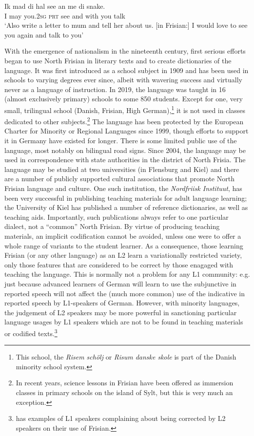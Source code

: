 \documentclass[output=paper]{langsci/langscibook}
\begin{document}
\gll Ik mad di hal see an me di snake. \\
     I may you.\textsc{2sg} \textsc{prt} see and with you talk\\
\glt ‘Also write a letter to mum and tell her about us. [in Frisian:] I would love to see you again and talk to you’ {\citep[91]{Jacobs-Owen2017}}
\z

With the emergence of nationalism in the nineteenth century, first serious efforts began to use North Frisian in literary texts and to create dictionaries of the language. It was first introduced as a school subject in 1909 and has been used in schools to varying degrees ever since, albeit with wavering success and virtually never as a language of instruction. In 2019, the language was taught in 16 (almost exclusively primary) schools to some 850 students. Except for one, very small, trilingual school (Danish, Frisian, High German),\footnote{This school, the \textit{Risem schölj} or \textit{Risum danske skole} is part of the Danish minority school system.} it is not used in classes dedicated to other subjects.\footnote{In recent years, science lessons in Frisian have been offered as immersion classes in primary schools on the island of Sylt, but this is very much an exception.} The language has been protected by the European Charter for Minority or Regional Languages since 1999, though efforts to support it in Germany have existed for longer. There is some limited public use of the language, most notably on bilingual road signs. Since 2004, the language may be used in correspondence with state authorities in the district of North Frisia. The language may be studied at two universities (in Flensburg and Kiel) and there are a number of publicly supported cultural associations that promote North Frisian language and culture. One such institution, the \textit{Nordfriisk Instituut}, has been very successful in publishing teaching materials for adult language learning; the University of Kiel has published a number of reference dictionaries, as well as teaching aids. Importantly, such publications always refer to one particular dialect, not a “common” North Frisian. By virtue of producing teaching materials, an implicit codification cannot be avoided, unless one were to offer a whole range of variants to the student learner. As a consequence, those learning Frisian (or any other language) as an L2 learn a variationally restricted variety, only those features that are considered to be correct by those enagaged with teaching the language. This is normally not a problem for any L1 community: e.g. just because advanced learners of German will learn to use the subjunctive in reported speech will not affect the (much more common) use of the indicative in reported speech by L1-speakers of German. However, with minority languages, the judgement of L2 speakers may be more powerful in sanctioning particular language usages by L1 speakers which are not to be found in teaching materials or codified texts.\footnote{\citet{AdmiraalEtAl2019} has examples of L1 speakers complaining about being corrected by L2 speakers on their use of Frisian.}
\end{document}

